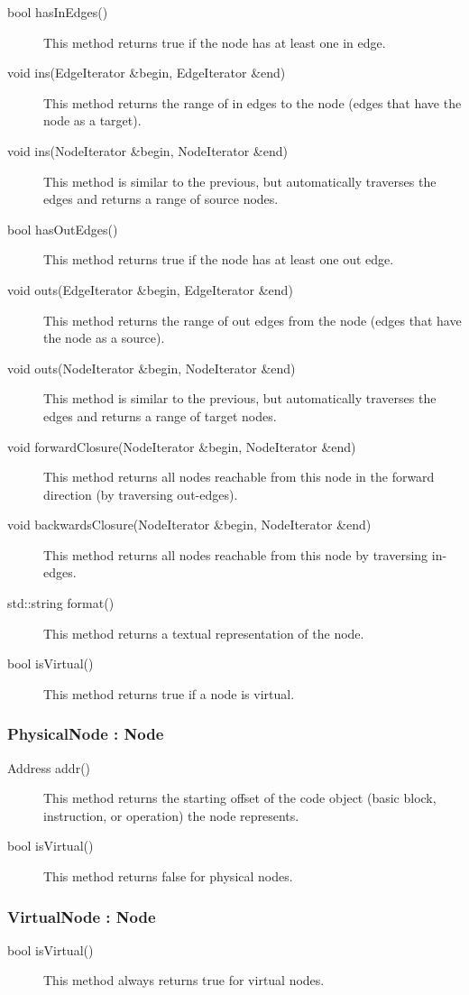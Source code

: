 \documentclass[12pt,titlepage]{article}
\begin{document}
\begin{description}
\item[bool hasInEdges()] This method returns true if the node has at
  least one in edge. 
\item[void ins(EdgeIterator \&begin, EdgeIterator \&end)]
This method returns the range of in edges to the node (edges that have the node as a target). 
\item[void ins(NodeIterator \&begin, NodeIterator \&end)]
This method is similar to the previous, but automatically traverses the edges and returns a range of source nodes. 
\item[bool hasOutEdges()] This method returns true if the node has at
  least one out edge. 
\item[void outs(EdgeIterator \&begin, EdgeIterator \&end)]
This method returns the range of out edges from the node (edges that have the node as a source). 
\item[void outs(NodeIterator \&begin, NodeIterator \&end)]
This method is similar to the previous, but automatically traverses the edges and returns a range of target nodes.
\item[void forwardClosure(NodeIterator \&begin, NodeIterator \&end)]
This method returns all nodes reachable from this node in the forward direction (by traversing out-edges).
\item[void backwardsClosure(NodeIterator \&begin, NodeIterator \&end)]
This method returns all nodes reachable from this node by traversing in-edges.
\item[std::string format()]
This method returns a textual representation of the node.
\item[bool isVirtual() ]
This method returns true if a node is virtual.
\end{description}

\subsubsection{PhysicalNode : Node}
\begin{description}
\item[Address addr()] This method returns the starting
offset of the code object (basic block, instruction, or operation) the
node represents.
\item[bool isVirtual()] This method returns false for physical nodes.
\end{description}

\subsubsection{VirtualNode : Node}
\begin{description}
\item[bool isVirtual()]
This method always returns true for virtual nodes.
\end{description}
\end{document}
